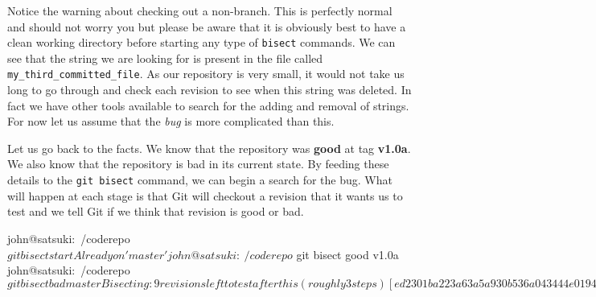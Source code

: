 
Notice the warning about checking out a non-branch.
This is perfectly normal and should not worry you but please be aware that it is obviously best to have a clean working directory before starting any type of \texttt{bisect} commands.
We can see that the string we are looking for is present in the file called \texttt{my\_third\_committed\_file}.
As our repository is very small, it would not take us long to go through and check each revision to see when this string was deleted.
In fact we have other tools available to search for the adding and removal of strings.
For now let us assume that the \emph{bug} is more complicated than this.

Let us go back to the facts.
We know that the repository was \textbf{good} at tag \textbf{v1.0a}.
We also know that the repository is bad in its current state.
By feeding these details to the \texttt{git bisect} command, we can begin a search for the bug.
What will happen at each stage is that Git will checkout a revision that it wants us to test and we tell Git if we think that revision is good or bad.

\begin{code}
john@satsuki:~/coderepo$ git bisect start
Already on 'master'
john@satsuki:~/coderepo$ git bisect good v1.0a
john@satsuki:~/coderepo$ git bisect bad master
Bisecting: 9 revisions left to test after this (roughly 3 steps)
[ed2301ba223a63a5a930b536a043444e019460a7] Removed third file
john@satsuki:~/coderepo$
\end{code}

